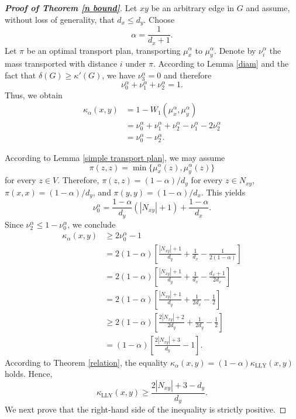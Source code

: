 \documentclass[10pt,a4paper]{article}
\theoremstyle{definition}
\theoremstyle{definition}
\theoremstyle{nonumber}
\newtheorem*{theorem*}{Theorem}
\begin{document}

\begin{proof}[\bf{Proof of Theorem \ref{n bound}}]
Let $xy$ be an arbitrary edge in $G$ and assume, without loss of generality, that $d_x \leq d_y$. Choose
$$\alpha = \frac{1}{d_x + 1}.$$
Let $\pi$ be an optimal transport plan, transporting $\mu_x^\alpha$ to $\mu_y^\alpha$. Denote by $\nu_i^\alpha$ the mass transported with distance $i$ under $\pi$. According to Lemma \ref{diam} and the fact that $\delta(G)\geq \kappa'(G)$, we have $\nu_3^\alpha = 0$ and therefore
$$
\nu_0^\alpha + \nu_1^\alpha + \nu_2^\alpha = 1.
$$
Thus, we obtain
\begin{align*} 
\kappa_\alpha(x, y) &= 1 - W_1(\mu_x^\alpha, \mu_y^\alpha)\\
&= \nu_0^\alpha + \nu_1^\alpha + \nu_2^\alpha - \nu_1^\alpha - 2\nu_2^\alpha\\
&= \nu_0^\alpha - \nu_2^\alpha.
\end{align*}

According to Lemma \ref{simple transport plan}, we may assume
$$
\pi(z, z) = \min\{\mu_x^\alpha(z), \mu_y^\alpha(z)\}
$$
for every $z \in V$. Therefore, $\pi(z, z) = (1 - \alpha)/d_y$ for every $z \in N_{xy}$, $\pi(x, x) = (1 - \alpha)/d_y$, and $\pi(y, y) = (1 - \alpha)/d_x$. This yields
$$\nu_0^\alpha = \frac{1 - \alpha}{d_y} (|N_{xy}| + 1) + \frac{1 - \alpha}{d_x}.$$
Since $\nu_2^\alpha \leq 1 - \nu_0^\alpha$, we conclude
\begin{align*} 
\kappa_\alpha(x, y) &\geq 2\nu_0^\alpha - 1\\
&= 2(1 - \alpha) \left[ \frac{|N_{xy}| + 1}{d_y} + \frac{1}{d_x} - \frac{1}{2(1 - \alpha)} \right]\\
&= 2(1 - \alpha) \left[ \frac{|N_{xy}| + 1}{d_y} + \frac{1}{d_x} - \frac{d_x + 1}{2d_x} \right]\\
&= 2(1 - \alpha) \left[ \frac{|N_{xy}| + 1}{d_y} + \frac{1}{2d_x} - \frac{1}{2} \right]\\
&\geq 2(1 - \alpha) \left[ \frac{2|N_{xy}| + 2}{2d_y} + \frac{1}{2d_y} - \frac{1}{2} \right]\\
&= (1 - \alpha) \left[ \frac{2|N_{xy}| + 3}{d_y} - 1 \right].
\end{align*}
According to Theorem \ref{relation}, the equality $\kappa_\alpha(x, y) = (1-\alpha)\kappa_{\mathrm{LLY}}(x, y)$ holds. Hence, 
$$
\kappa_{\mathrm{LLY}}(x, y) \geq \frac{2|N_{xy}| + 3-d_y}{d_y}.
$$
We next prove that the right-hand side of the inequality is strictly positive.


\end{proof}
\end{document}
